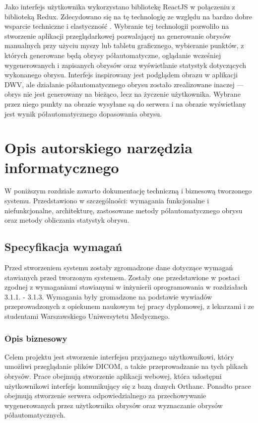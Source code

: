 \documentclass[a4paper,11pt,twoside,openright]{report}
\newcommand\blankpage{%
    \null
    \thispagestyle{empty}%
    \newpage}
\theoremstyle{definition}
\begin{document}
Jako interfejs użytkownika wykorzystano bibliotekę ReactJS \cite{React} w połączeniu
z biblioteką Redux\cite{Redux}. Zdecydowano się na tę technologię ze względu na bardzo dobre wsparcie techniczne
i elastyczność \cite{Dlaczego react}. Wybranie tej technologii pozwoliło na stworzenie
aplikacji przeglądarkowej pozwalającej na generowanie obrysów manualnych przy
użyciu myszy lub tabletu graficznego, wybieranie punktów, z których generowane
będą obrysy półautomatyczne, oglądanie wcześniej wygenerowanych i zapisanych
obrysów oraz wyświetlanie statystyk dotyczących wykonanego obrysu. Interfejs
inspirowany jest podglądem obrazu w aplikacji DWV, ale działanie półautomatycznego
obrysu zostało zrealizowane inaczej --- obrys nie jest generowany na bieżąco, lecz na życzenie
użytkownika. Wybrane przez niego punkty na obrazie wysyłane są do serwera i na obrazie wyświetlany jest
wynik półautomatycznego dopasowania obrysu.


\chapter {Opis autorskiego narzędzia informatycznego}

W poniższym rozdziale zawarto dokumentację techniczną i biznesową tworzonego systemu.
 Przedstawiono w szczególności: wymagania funkcjonalne i niefunkcjonalne,
 architekturę, zastosowane metody półautomatycznego obrysu oraz metody obliczania
 statystyk obrysu.

\section {Specyfikacja wymagań}

Przed stworzeniem systemu zostały zgromadzone dane dotyczące wymagań stawianych
przed tworzonym systemem. Zostały one przedstawione w postaci zgodnej z wymaganiami
stawianymi w inżynierii oprogramowania w rozdziałach 3.1.1. - 3.1.3. Wymagania
były gromadzone na podstawie wywiadów przeprowadzonych z opiekunem naukowym tej
pracy dyplomowej, z lekarzami i ze studentami Warszawskiego Uniwersytetu Medycznego.

\subsection {Opis biznesowy}

Celem projektu jest stworzenie interfejsu przyjaznego użytkownikowi, który umożliwi
przeglądanie plików DICOM, a także przeprowadzanie na tych plikach obrysów. Prace
obejmują stworzenie aplikacji webowej, która udostępni użytkownikowi interfejs
komunikujący się z bazą danych Orthanc. Ponadto prace obejmują stworzenie serwera
odpowiedzialnego za przechowywanie wygenerowanych przez użytkownika obrysów oraz
wyznaczanie obrysów półautomatycznych.
\end{document}
